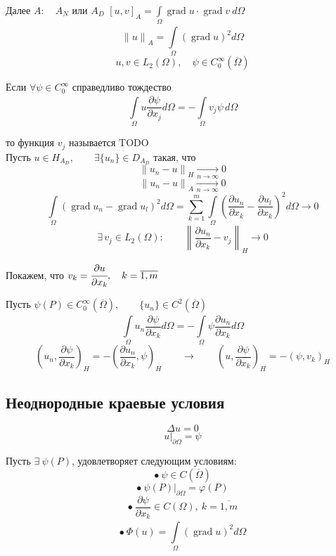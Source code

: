 \documentclass[12pt, a4paper]{article}
\newcommand{\Int}{\int\limits}
\newcommand{\Sum}{\sum\limits}
\begin{document}
Далее $ A: \quad A_N $ или $ A_D $ \qquad $ {[u, v]}_A = \Int_{\Omega}^{} \operatorname{grad} u \cdot \operatorname{grad} v \ d\Omega$ 
\[ {\|u\|}_A = \Int_{\Omega}^{} (\operatorname{grad} u )^2 d \Omega \]
\[ u, v \in L_2 (\Omega), \quad \psi \in C^{\infty}_0 (\overline{ \Omega}) \]

Если $\forall \psi \in C^{\infty}_0$ справедливо тождество
\[ \Int_{\Omega}^{} u \frac{\partial \psi}{\partial x_j} d\Omega = -\Int_{\Omega} v_j \psi \, d \Omega \]

то функция $v_j$ называется TODO \\

Пусть $u \in H_{A_D}, \qquad \exists \{u_n\} \in D_{A_{D}}$ такая, что
\[ {\|u_n - u\|}_H \underset{n \rightarrow \infty}{\rightarrow} 0 \]
\[ {\|u_n - u\|}_A \underset{n \rightarrow \infty}{\rightarrow} 0 \]
\[ \Int_{\Omega} {(\operatorname{grad} u_n - \operatorname{grad} u_l)}^2 d\Omega = \Sum_{k=1}^{m} \Int_{\Omega} {\left( \frac{\partial  u_n}{\partial  x_k} - \frac{\partial u_l}{\partial x_k} \right)}^2 d \Omega \rightarrow 0 \]
\[ \exists \, v_j \in L_2(\Omega): \qquad {\left\| \frac{\partial u_n}{\partial x_k} - v_j \right\|}_H \rightarrow 0 \]

Покажем, что $ v_k = \cfrac{\partial u}{\partial x_k}, \quad k=\overline{1,m} $

Пусть $ \psi(P) \in C^{\infty}_{0} ( \overline{\Omega}), \qquad \{u_n\} \in C^2(\overline{\Omega}) $
\[ \Int_{\Omega}^{} u_n \frac{\partial \psi}{\partial x_k} d\Omega = - \Int_{\Omega}^{} \psi \frac{\partial u_n}{\partial x_k} d\Omega \]
\[ {\left( u_n, \frac{\partial \psi}{\partial  x_k} \right)}_H = - {\left( \frac{\partial  u_n}{\partial x_k}, \psi \right)}_H \qquad \rightarrow \qquad {\left( u, \frac{\partial \psi}{\partial  x_k} \right)}_H = -(\psi, v_k)_H \]

\subsection{Неоднородные краевые условия}

\[ \Delta u = 0 \label{7.1} \tag{7.1} \]
\[ u|_{\partial \Omega} = \psi \label{7.2} \tag{7.2} \]

Пусть $\exists \ \psi(P)$, удовлетворяет следующим условиям:
\[ \bullet \ \psi \in C(\overline{\Omega}) \]
\[ \bullet \ {\left. \psi (P) \right|}_{\partial \Omega} = \varphi(P) \]
\[ \bullet \ \frac{\partial  \psi}{\partial  x_k} \in C(\Omega), \ k=\overline{1,m} \]
\[ \bullet \ \Phi(u) = \Int_{\Omega}^{} (\operatorname{grad} u)^2 d\Omega \label{7.3} \tag{7.3} \]
\end{document}
